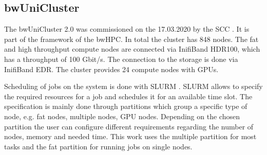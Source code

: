 \subsection{bwUniCluster}
\label{subsec:bw_uni_cluster}
The bwUniCluster 2.0 was commissioned on the 17.03.2020 by the \gls{SCC} \cite{haefner_kit_2020}.
It is part of the framework of the \gls{bwHPC}. In total the cluster has 848 nodes.
The fat and high throughput compute nodes are connected via InifiBand HDR100, which has a throughput of 100 Gbit/s.
The connection to the storage is done via InifiBand EDR.
The cluster provides 24 compute nodes with \glspl{GPU}.

Scheduling of jobs on the system is done with \gls{SLURM} \cite{yoo_slurm_2003}.
\gls{SLURM} allows to specify the required resources for a job and schedules it for an available time slot.
The specification is mainly done through partitions which group a specific type of node, e.g. fat nodes, multiple nodes, \gls{GPU} nodes.
Depending on the chosen partition the user can configure different requirements regarding the number of nodes, memory and needed time.
This work uses the multiple partition for most tasks and the fat partition for running jobs on single nodes.
